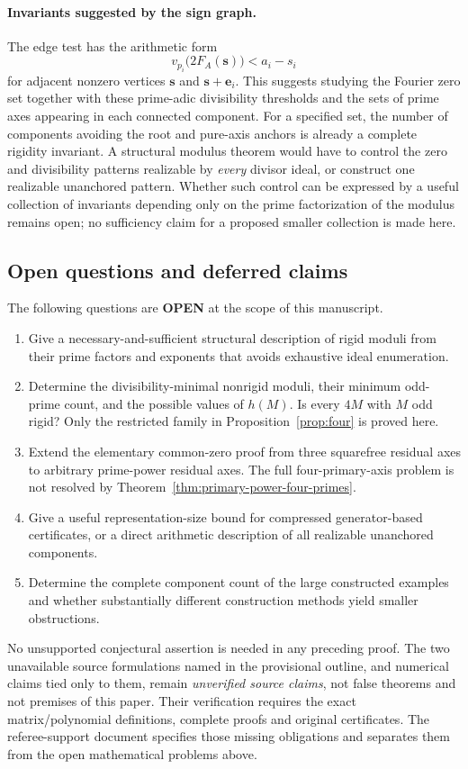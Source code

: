 \paragraph{Invariants suggested by the sign graph.}
The edge test has the arithmetic form
\[
 v_{p_i}\!\bigl(2F_A(\boldsymbol s)\bigr)<a_i-s_i
\]
for adjacent nonzero vertices $\boldsymbol s$ and
$\boldsymbol s+\boldsymbol e_i$. This suggests studying the Fourier zero
set together with these prime-adic divisibility thresholds and the sets
of prime axes appearing in each connected component. For a specified
set, the number of components avoiding the root and pure-axis anchors is
already a complete rigidity invariant. A structural modulus theorem
would have to control the zero and divisibility patterns realizable by
\emph{every} divisor ideal, or construct one realizable unanchored
pattern. Whether such control can be expressed by a useful collection
of invariants depending only on the prime factorization of the modulus
remains open; no sufficiency claim for a proposed smaller collection is
made here.

\subsection{Open questions and deferred claims}
The following questions are \textbf{OPEN} at the scope of this manuscript.
\begin{enumerate}[label=(\roman*)]
\item Give a necessary-and-sufficient structural description of rigid moduli from their prime factors and exponents that avoids exhaustive ideal enumeration.
\item Determine the divisibility-minimal nonrigid moduli, their minimum odd-prime count, and the possible values of $h(M)$. Is every $4M$ with $M$ odd rigid? Only the restricted family in Proposition~\ref{prop:four} is proved here.
\item Extend the elementary common-zero proof from three squarefree residual axes to arbitrary prime-power residual axes. The full four-primary-axis problem is not resolved by Theorem~\ref{thm:primary-power-four-primes}.
\item Give a useful representation-size bound for compressed generator-based certificates, or a direct arithmetic description of all realizable unanchored components.
\item Determine the complete component count of the large constructed examples and whether substantially different construction methods yield smaller obstructions.
\end{enumerate}
No unsupported conjectural assertion is needed in any preceding proof. The two unavailable source formulations named in the provisional outline, and numerical claims tied only to them, remain \emph{unverified source claims}, not false theorems and not premises of this paper. Their verification requires the exact matrix/polynomial definitions, complete proofs and original certificates. The referee-support document specifies those missing obligations and separates them from the open mathematical problems above.
